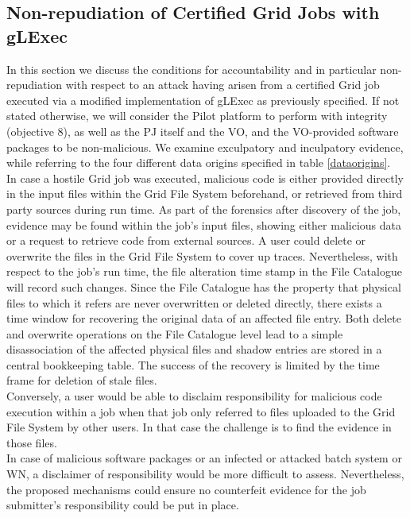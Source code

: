 \documentclass[10pt]{iopart}
\begin{document}
\subsection{Non-repudiation of Certified Grid Jobs with
gLExec}
\label{nrepud}
In this section we discuss the conditions for accountability and
in particular 
non-repudiation with respect to an attack having arisen
from a certified Grid job executed via a modified
implementation of gLExec as previously specified. 
If not stated
otherwise, we will consider the Pilot platform to
perform with integrity (objective 8), as well as the PJ itself and the VO,
and the VO-provided software packages to be non-malicious.
We examine exculpatory and inculpatory evidence, while 
referring to the four different data origins specified in table
\ref{dataorigins}.\\
In case a hostile Grid job was executed,
malicious code is either provided directly in the input files within 
the Grid File System beforehand, or
retrieved from third party sources during run time. As part of the forensics
after discovery of the job, evidence may be found within the job's input
files, showing either malicious data or a request to retrieve code
from external sources.
A user could delete or overwrite the
files in the Grid File System to cover up traces. Nevertheless, with
respect to the job's run time, the file alteration time stamp in the File
Catalogue will record such changes.
Since the File Catalogue has the property that physical files to which
it refers are never overwritten or deleted directly, there exists a time window
for recovering the original data of an affected file entry.
Both delete and overwrite
operations on the File Catalogue level lead to a simple disassociation of the
affected physical files and shadow entries are stored in a central bookkeeping
table. The success
of the recovery is limited by the time frame for deletion of stale files.\\
Conversely, a user would be able to disclaim responsibility for
malicious code execution within a job when that job only referred to
files uploaded to the Grid File System by other users.
In that case the challenge is to find the evidence in those files.\\
In case of malicious software packages or an infected or attacked batch system
or WN, a disclaimer of responsibility would be more difficult to assess.
Nevertheless, the proposed
mechanisms could ensure no counterfeit evidence for the job submitter's
responsibility could be put in place.\\
\end{document}
